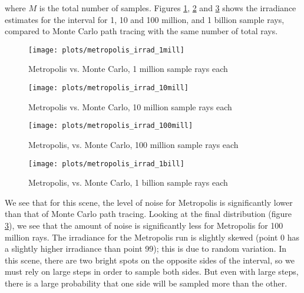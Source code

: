\documentclass{article} %
\begin{document}
where $M$ is the total number of samples. Figures \ref{fig:metropolis_irrad1}, \ref{fig:metropolis_irrad10} and \ref{fig:metropolis_irrad100} shows the irradiance estimates for the interval for 1, 10 and 100 million, and 1 billion sample rays, compared to Monte Carlo path tracing with the same number of total rays.

\begin{figure}[h]
    \centering
    \texttt{[image: plots/metropolis\_irrad\_1mill]}\\
    \caption{Metropolis vs. Monte Carlo, 1 million sample rays each}
    \label{fig:metropolis_irrad1}
\end{figure}

\begin{figure}
    \centering
    \texttt{[image: plots/metropolis\_irrad\_10mill]}\\
    \caption{Metropolis vs. Monte Carlo, 10 million sample rays each}
    \label{fig:metropolis_irrad10}
\end{figure}

\begin{figure}
    \centering
    \texttt{[image: plots/metropolis\_irrad\_100mill]}\\
    \caption{Metropolis, vs. Monte Carlo, 100 million sample rays each}
    \label{fig:metropolis_irrad100}
\end{figure}

\begin{figure}
    \centering
    \texttt{[image: plots/metropolis\_irrad\_1bill]}\\
    \caption{Metropolis, vs. Monte Carlo, 1 billion sample rays each}
    \label{fig:metropolis_irrad1000}
\end{figure}

We see that for this scene, the level of noise for Metropolis is significantly lower than that of Monte Carlo path tracing. Looking at the final distribution (figure \ref{fig:metropolis_irrad100}), we see that the amount of noise is significantly less for Metropolis for 100 million rays. The irradiance for the Metropolis run is slightly skewed (point 0 has a slightly higher irradiance than point 99); this is due to random variation. In this scene, there are two bright spots on the opposite sides of the interval, so we must rely on large steps in order to sample both sides. But even with large steps, there is a large probability that one side will be sampled more than the other.
\end{document}
